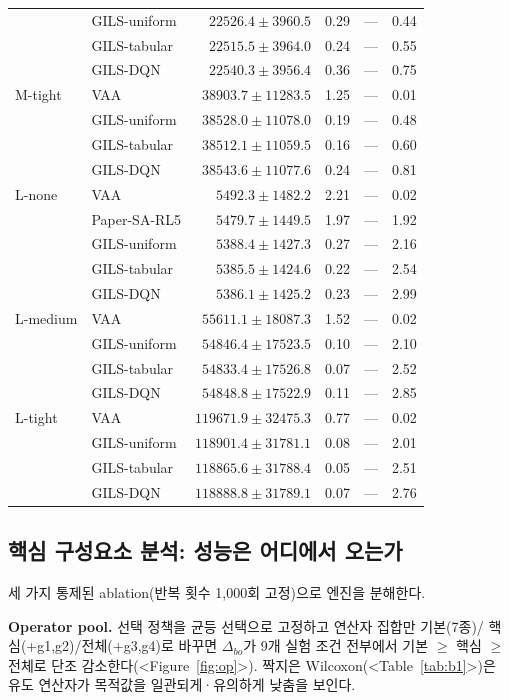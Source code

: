 \documentclass[10pt,a4paper]{article}
\begin{document}
\begin{table}[t]
\begin{tabular}{@{}llrrrr@{}}
 & GILS-uniform & $22526.4\pm3960.5$ & 0.29 & --- & 0.44\\
 & GILS-tabular & $22515.5\pm3964.0$ & 0.24 & --- & 0.55\\
 & GILS-DQN & $22540.3\pm3956.4$ & 0.36 & --- & 0.75\\
M-tight & VAA & $38903.7\pm11283.5$ & 1.25 & --- & 0.01\\
 & GILS-uniform & $38528.0\pm11078.0$ & 0.19 & --- & 0.48\\
 & GILS-tabular & $38512.1\pm11059.5$ & 0.16 & --- & 0.60\\
 & GILS-DQN & $38543.6\pm11077.6$ & 0.24 & --- & 0.81\\
L-none & VAA & $5492.3\pm1482.2$ & 2.21 & --- & 0.02\\
 & Paper-SA-RL5 & $5479.7\pm1449.5$ & 1.97 & --- & 1.92\\
 & GILS-uniform & $5388.4\pm1427.3$ & 0.27 & --- & 2.16\\
 & GILS-tabular & $5385.5\pm1424.6$ & 0.22 & --- & 2.54\\
 & GILS-DQN & $5386.1\pm1425.2$ & 0.23 & --- & 2.99\\
L-medium & VAA & $55611.1\pm18087.3$ & 1.52 & --- & 0.02\\
 & GILS-uniform & $54846.4\pm17523.5$ & 0.10 & --- & 2.10\\
 & GILS-tabular & $54833.4\pm17526.8$ & 0.07 & --- & 2.52\\
 & GILS-DQN & $54848.8\pm17522.9$ & 0.11 & --- & 2.85\\
L-tight & VAA & $119671.9\pm32475.3$ & 0.77 & --- & 0.02\\
 & GILS-uniform & $118901.4\pm31781.1$ & 0.08 & --- & 2.01\\
 & GILS-tabular & $118865.6\pm31788.4$ & 0.05 & --- & 2.51\\
 & GILS-DQN & $118888.8\pm31789.1$ & 0.07 & --- & 2.76\\
\bottomrule
\end{tabular}
\end{table}

\subsection{핵심 구성요소 분석: 성능은 어디에서 오는가}
세 가지 통제된 ablation(반복 횟수 1{,}000회 고정)으로 엔진을 분해한다.

\textbf{Operator pool.} 선택 정책을 균등 선택으로 고정하고 연산자 집합만 기본(7종)/
핵심(+g1,g2)/전체(+g3,g4)로 바꾸면 $\Delta_{bo}$가 9개 실험 조건 전부에서
기본 $\ge$ 핵심 $\ge$ 전체로 단조 감소한다(<Figure~\ref{fig:op}>). 짝지은
Wilcoxon(<Table~\ref{tab:b1}>)은 유도 연산자가 목적값을 일관되게·유의하게 낮춤을
보인다.
\end{document}
